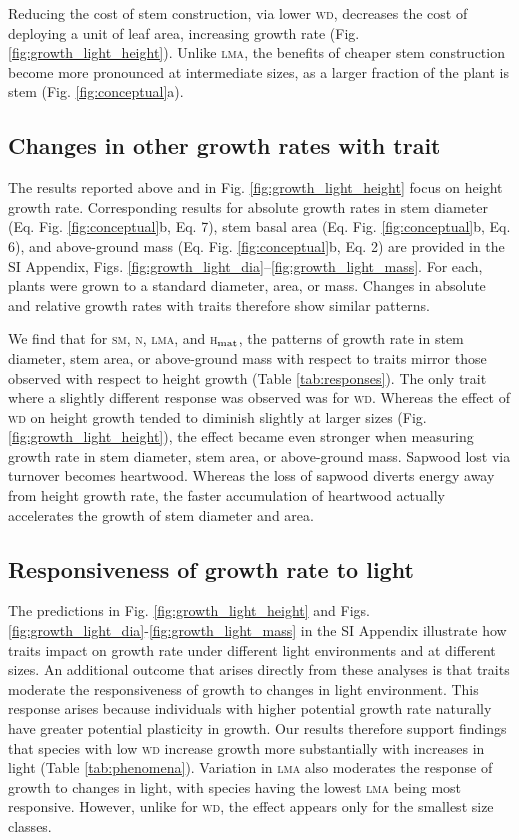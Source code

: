 \documentclass[9pt,twocolumn,twoside,lineno]{pnas-new}
\newcommand{\lma}{\textsc{lma}}
\newcommand{\wood}{\textsc{wd}}
\newcommand{\seed}{\textsc{sm}}
\newcommand{\hmat}{\textsc{h}$_{\rm mat}$}
\newcommand{\nitrogen}{\textsc{n}}
\begin{document}
Reducing the cost of stem construction, via lower {\wood}, decreases the cost of deploying a unit of leaf area, increasing growth rate (Fig. \ref{fig:growth_light_height}). Unlike {\lma}, the benefits of cheaper stem construction become more pronounced at intermediate sizes, as a larger fraction of the plant is stem (Fig. \ref{fig:conceptual}a).

\subsection*{Changes in other growth rates with trait}

The results reported above and in Fig. \ref{fig:growth_light_height} focus on height growth rate. Corresponding results for absolute growth rates in stem diameter (Eq. Fig. \ref{fig:conceptual}b, Eq. {\color{pnasbluetext}7}), stem basal area (Eq. Fig. \ref{fig:conceptual}b, Eq. {\color{pnasbluetext}6}), and above-ground mass (Eq. Fig. \ref{fig:conceptual}b, Eq. {\color{pnasbluetext}2}) are provided in the SI Appendix, Figs. \ref{fig:growth_light_dia}--\ref{fig:growth_light_mass}. For each, plants were grown to a standard diameter, area, or mass. Changes in absolute and relative growth rates with traits therefore show similar patterns.

We find that for {\seed}, {\nitrogen}, {\lma}, and {\hmat}, the patterns of growth rate in stem diameter, stem area, or above-ground mass with respect to traits mirror those observed with respect to height growth (Table \ref{tab:responses}). The only trait where a slightly different response was observed was for {\wood}. Whereas the effect of {\wood} on height growth tended to diminish slightly at larger sizes (Fig. \ref{fig:growth_light_height}), the effect became even stronger when measuring growth rate in stem diameter, stem area, or above-ground mass. Sapwood lost via turnover becomes heartwood. Whereas the loss of sapwood diverts energy away from height growth rate, the faster accumulation of heartwood actually accelerates the growth of stem diameter and area.



\subsection*{Responsiveness of growth rate to light}

The predictions in Fig. \ref{fig:growth_light_height} and Figs. \ref{fig:growth_light_dia}-\ref{fig:growth_light_mass} in the SI Appendix illustrate how traits impact on growth rate under different light environments and at different sizes. An additional outcome that arises directly from these analyses is that traits moderate the responsiveness of growth to changes in light environment. This response arises because individuals with higher potential growth rate naturally have greater potential plasticity in growth. Our results therefore support findings that species with low {\wood} increase growth more substantially with increases in light (Table \ref{tab:phenomena}). Variation in {\lma} also moderates the response of growth to changes in light, with species having the lowest {\lma} being most responsive. However, unlike for {\wood}, the effect appears only for the smallest size classes.
\end{document}
